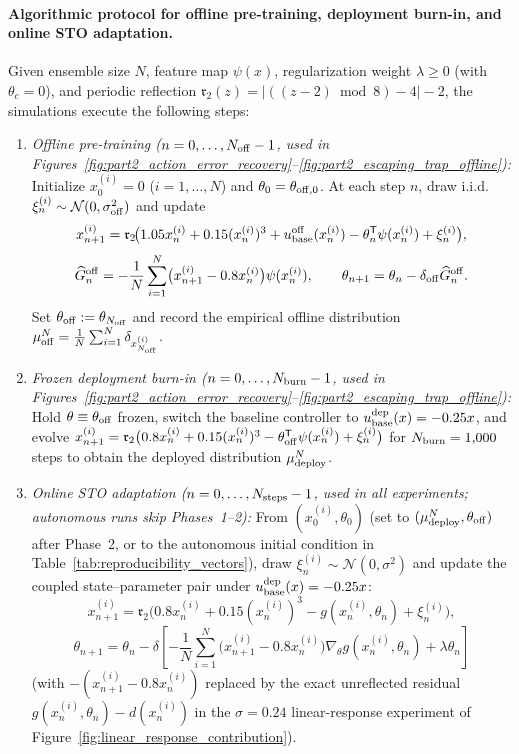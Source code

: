 \paragraph{Algorithmic protocol for offline pre-training, deployment burn-in, and online STO adaptation.}
Given ensemble size $N$, feature map $\psi(x)$, regularization weight $\lambda \ge 0$ (with $\theta_c=0$), and periodic reflection $\mathfrak{r}_2(z) = \lvert ((z-2)\bmod 8) - 4\rvert - 2$, the simulations execute the following steps:
\begin{enumerate}[label=\textbf{Phase~\arabic*:}, leftmargin=4.2em]
    \item \emph{Offline pre-training ($n=0,\ldots,N_{\rm off}-1$, used in Figures~\ref{fig:part2_action_error_recovery}--\ref{fig:part2_escaping_trap_offline}):} Initialize $x_0^{(i)}=0$ ($i=1,\ldots,N$) and $\theta_0 = \theta_{\rm off,0}$. At each step $n$, draw i.i.d.\ $\xi_n^{(i)}\sim\mathcal{N}(0,\sigma_{\rm off}^2)$ and update
    \[
        x_{n+1}^{(i)} = \mathfrak{r}_2\!\bigl(1.05x_n^{(i)} + 0.15(x_n^{(i)})^3 + u_{\rm base}^{\rm off}(x_n^{(i)}) - \theta_n^{\mathsf T}\psi(x_n^{(i)}) + \xi_n^{(i)}\bigr),
    \]
    \[
        \widehat G_{n}^{\rm off} = -\frac{1}{N}\sum_{i=1}^N \bigl(x_{n+1}^{(i)} - 0.8x_n^{(i)}\bigr)\psi(x_n^{(i)}), \qquad \theta_{n+1} = \theta_n - \delta_{\rm off}\widehat G_{n}^{\rm off}.
    \]
    Set $\theta_{\rm off} := \theta_{N_{\rm off}}$ and record the empirical offline distribution $\mu_{\rm off}^N = \frac{1}{N}\sum_{i=1}^N \delta_{x_{N_{\rm off}}^{(i)}}$.
    \item \emph{Frozen deployment burn-in ($n=0,\ldots,N_{\rm burn}-1$, used in Figures~\ref{fig:part2_action_error_recovery}--\ref{fig:part2_escaping_trap_offline}):} Hold $\theta \equiv \theta_{\rm off}$ frozen, switch the baseline controller to $u_{\rm base}^{\rm dep}(x) = -0.25x$, and evolve $x_{n+1}^{(i)} = \mathfrak{r}_2\bigl(0.8x_n^{(i)} + 0.15(x_n^{(i)})^3 - \theta_{\rm off}^{\mathsf T}\psi(x_n^{(i)}) + \xi_n^{(i)}\bigr)$ for $N_{\rm burn}=1{,}000$ steps to obtain the deployed distribution $\mu_{\rm deploy}^N$.
    \item \emph{Online STO adaptation ($n=0,\ldots,N_{\rm steps}-1$, used in all experiments; autonomous runs skip Phases~1--2):} From $(x_0^{(i)},\theta_0)$ (set to $(\mu_{\rm deploy}^N,\theta_{\rm off})$ after Phase~2, or to the autonomous initial condition in Table~\ref{tab:reproducibility_vectors}), draw $\xi_n^{(i)}\sim\mathcal{N}(0,\sigma^2)$ and update the coupled state--parameter pair under $u_{\rm base}^{\rm dep}(x)=-0.25x$:
    \[
        x_{n+1}^{(i)} = \mathfrak{r}_2\!\bigl(0.8x_n^{(i)} + 0.15(x_n^{(i)})^3 - g(x_n^{(i)},\theta_n) + \xi_n^{(i)}\bigr),
    \]
    \[
        \theta_{n+1} = \theta_n - \delta\left[-\frac{1}{N}\sum_{i=1}^N \bigl(x_{n+1}^{(i)} - 0.8x_n^{(i)}\bigr)\nabla_\theta g(x_n^{(i)},\theta_n) + \lambda\theta_n\right]
    \]
    (with $-(x_{n+1}^{(i)}-0.8x_n^{(i)})$ replaced by the exact unreflected residual $g(x_n^{(i)},\theta_n)-d(x_n^{(i)})$ in the $\sigma=0.24$ linear-response experiment of Figure~\ref{fig:linear_response_contribution}).
\end{enumerate}